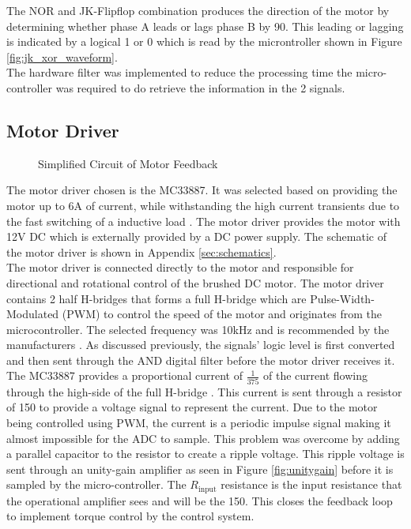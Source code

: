  The NOR and JK-Flipflop combination produces the direction of the motor by determining whether phase A leads or lags phase B by 90\textdegree. This leading or lagging is indicated by a logical 1 or 0 which is read by the microntroller shown in Figure \ref{fig:jk_xor_waveform}.\\
 
 The hardware filter was implemented to reduce the processing time the micro-controller was required to do retrieve the information in the 2 signals.



\subsection{Motor Driver}
\begin{figure}[h]
	\centering
	
	\caption{Simplified Circuit of Motor Feedback}
	\label{fig:feedback_current}
\end{figure}


The motor driver chosen is the MC33887. It was selected based on providing the motor up to 6A of current, while withstanding the high current transients due to the fast switching of a inductive load \citep{motorIC}. The motor driver provides the motor with 12V DC which is externally provided by a DC power supply. The schematic of the motor driver is shown in Appendix \ref{sec:schematics}.\\

The motor driver is connected directly to the motor and responsible for directional and rotational control of the brushed DC motor. The motor driver contains 2 half H-bridges that forms a full H-bridge which are Pulse-Width-Modulated (PWM) to control the speed of the motor and originates from the microcontroller. The selected frequency was 10kHz and is recommended by the manufacturers \cite{motorIC}. As discussed previously, the signals' logic level is first converted and then sent through the AND digital filter before the motor driver receives it.\\


The MC33887 provides a proportional current of $\frac{1}{375}$ of the current flowing through the high-side of the full H-bridge \citep{motorIC}. This current is sent through a resistor of \SI{150}{\Omega} to provide a voltage signal to represent the current. Due to the motor being controlled using PWM, the current is a periodic impulse signal making it almost impossible for the ADC to sample. This problem was overcome by adding a parallel capacitor to the resistor to create a ripple voltage. This ripple voltage is sent through an unity-gain amplifier as seen in Figure \ref{fig:unitygain} before it is sampled by the micro-controller. The $R_{\text{input}}$ resistance is the input resistance that the operational amplifier sees and will be the \SI{150}{\Omega}. This closes the feedback loop to implement torque control by the control system.\\


